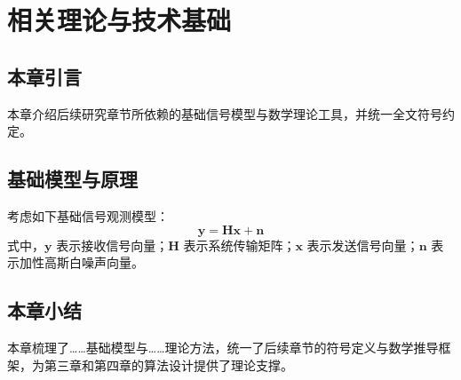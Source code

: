 \chapter{相关理论与技术基础}

\section{本章引言}
本章介绍后续研究章节所依赖的基础信号模型与数学理论工具，并统一全文符号约定。

\section{基础模型与原理}
考虑如下基础信号观测模型：
\begin{equation}
  \mathbf{y} = \mathbf{H}\mathbf{x} + \mathbf{n}
  \label{eq:base_model}
\end{equation}
式中，$\mathbf{y}$ 表示接收信号向量；$\mathbf{H}$ 表示系统传输矩阵；$\mathbf{x}$ 表示发送信号向量；$\mathbf{n}$ 表示加性高斯白噪声向量。

\section{本章小结}
本章梳理了……基础模型与……理论方法，统一了后续章节的符号定义与数学推导框架，为第三章和第四章的算法设计提供了理论支撑。
